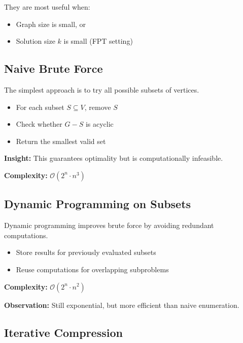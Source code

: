 \documentclass[10pt,a4paper]{report}
\theoremstyle{definition}
\newcommand{\bigO}[1]{\mathcal{O}\!\left(#1\right)}
\begin{document}
They are most useful when:
\begin{itemize}
  \item Graph size is small, or
  \item Solution size $k$ is small (FPT setting)
\end{itemize}

\subsection{Naive Brute Force}

The simplest approach is to try all possible subsets of vertices.

\begin{itemize}
  \item For each subset $S \subseteq V$, remove $S$
  \item Check whether $G - S$ is acyclic
  \item Return the smallest valid set
\end{itemize}

\textbf{Insight:} This guarantees optimality but is computationally infeasible.

\textbf{Complexity:} $\bigO{2^n \cdot n^3}$

\subsection{Dynamic Programming on Subsets}

Dynamic programming improves brute force by avoiding redundant computations.

\begin{itemize}
  \item Store results for previously evaluated subsets
  \item Reuse computations for overlapping subproblems
\end{itemize}

\textbf{Complexity:} $\bigO{2^n \cdot n^2}$

\textbf{Observation:} Still exponential, but more efficient than naive enumeration.

\subsection{Iterative Compression}
\end{document}
